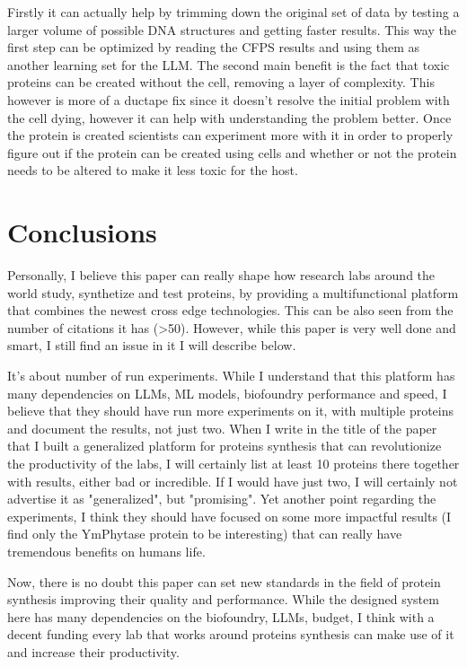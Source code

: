 \documentclass[10pt,a4paper]{article}
\begin{document}
	Firstly it can actually help by trimming down the original set of data by testing a larger volume of possible DNA structures and getting faster results. This way the first step can be optimized by reading the CFPS results and using them as another learning set for the LLM. The second main benefit is the fact that toxic proteins can be created without the cell, removing a layer of complexity. This however is more of a ductape fix since it doesn't resolve the initial problem with the cell dying, however it can help with understanding the problem better. Once the protein is created scientists can experiment more with it in order to properly figure out if the protein can be created using cells and whether or not the protein needs to be altered to make it less toxic for the host.
	
	\section{Conclusions}
	
	Personally, I believe this paper can really shape how research labs around the world study, synthetize and test proteins, by providing a multifunctional platform that combines the newest cross edge technologies. This can be also seen from the number of citations it has (>50). However, while this paper is very well done and smart, I still find an issue in it I will describe below.
	
	It's about number of run experiments. While I understand that this platform has many dependencies on LLMs, ML models, biofoundry performance and speed, I believe that they should have run more experiments on it, with multiple proteins and document the results, not just two. When I write in the title of the paper that I built a generalized platform for proteins synthesis that can revolutionize the productivity of the labs, I will certainly list at least 10 proteins there together with results, either bad or incredible. If I would have just two, I will certainly not advertise it as "generalized", but "promising". Yet another point regarding the experiments, I think they should have focused on some more impactful results (I find only the YmPhytase protein to be interesting) that can really have tremendous benefits on humans life.
	
	Now, there is no doubt this paper can set new standards in the field of protein synthesis improving their quality and performance. While the designed system here has many dependencies on the biofoundry, LLMs, budget, I think with a decent funding every lab that works around proteins synthesis can make use of it and increase their productivity.
	
\end{document}
